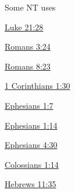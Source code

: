 				
				\begin{compactdesc}
					\item[Some NT uses] \textbf{}
						\begin{compactdesc}
							\item[{\hyperref[LUKE-21-28]{Luke 21:28}}]
							\item[{\hyperref[ROMANS-3-24]{Romans 3:24}}]
							\item[{\hyperref[ROMANS-8-23]{Romans 8:23}}]
							\item[{\hyperref[1CORINTHIANS-1-30]{1 Corinthians 1:30}}]
							\item[{\hyperref[EPHESIANS-1-7]{Ephesians 1:7}}]
							\item[{\hyperref[EPHESIANS-1-14]{Ephesians 1:14}}]
							\item[{\hyperref[EPHESIANS-4-30]{Ephesians 4:30}}]
							\item[{\hyperref[COLOSSIANS-1-14]{Colossians 1:14}}]
							\item[{\hyperref[HEBREWS-11-35]{Hebrews 11:35}}]
						\end{compactdesc}
				\end{compactdesc}
		
			\subparagraph{\texorpdfstring{}{}}
				\label{LUTROSIS}
			
